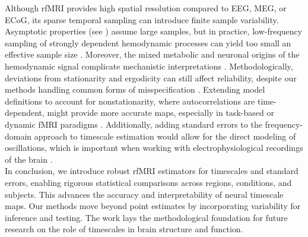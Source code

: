 \documentclass[latex/main.tex]{subfiles}
\begin{document}
Although rfMRI provides high spatial resolution compared to EEG, MEG, or ECoG, its sparse temporal sampling can introduce finite sample variability. Asymptotic properties (see ) assume large samples, but in practice, low-frequency sampling of strongly dependent hemodynamic processes can yield too small an effective sample size \citep{afyouni_effective_2019, kaneoke_variance_2012}. Moreover, the mixed metabolic and neuronal origins of the hemodynamic signal complicate mechanistic interpretations \citep{raut_hierarchical_2020, he_scale-free_2011}. Methodologically, deviations from stationarity and ergodicity can still affect reliability, despite our methods handling common forms of misspecification \citep[Chapter~14.7]{hansen_econometrics_2022}. Extending model definitions to account for nonstationarity, where autocorrelations are time-dependent, might provide more accurate maps, especially in task-based or dynamic fMRI paradigms \citep{he_scale-free_2011}. Additionally, adding standard errors to the frequency-domain approach to timescale estimation would allow for the direct modeling of oscillations, which is important when working with electrophysiological recordings of the brain \citep{donoghue_parameterizing_2020, gao_neuronal_2020}.\\

In conclusion, we introduce robust rfMRI estimators for timescales and standard errors, enabling rigorous statistical comparisons across regions, conditions, and subjects. This advances the accuracy and interpretability of neural timescale maps. Our methods move beyond point estimates by incorporating variability for inference and testing. The work lays the methodological foundation for future research on the role of timescales in brain structure and function.
\end{document}
